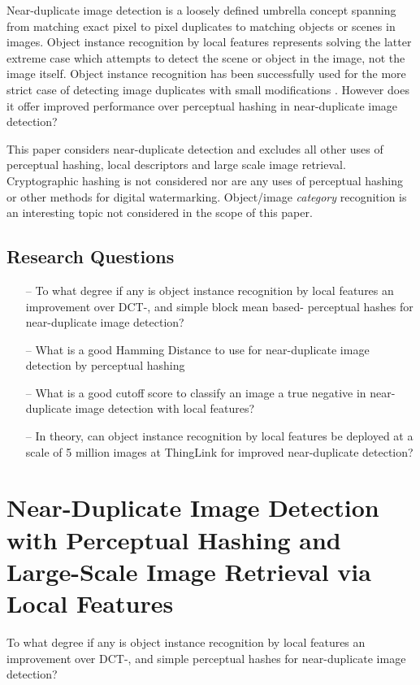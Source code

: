 \documentclass[english,12pt,a4paper,pdftex,elec,utf8, table]{aaltothesis}
\begin{document}
Near-duplicate image detection is a loosely defined umbrella concept spanning from matching exact pixel to pixel duplicates to matching objects or scenes in images. Object instance recognition by local features represents solving the latter extreme case which attempts to detect the scene or object in the image, not the image itself. Object instance recognition has been successfully used for the more strict case of detecting image duplicates with small modifications \cite{dong2012high}. However does it offer improved performance over perceptual hashing in near-duplicate image detection?

This paper considers near-duplicate detection and excludes all other uses of perceptual hashing, local descriptors and large scale image retrieval. Cryptographic hashing is not considered nor are any uses of perceptual hashing or other methods for digital watermarking. Object/image \emph{category} recognition is an interesting topic not considered in the scope of this paper.

\subsection{Research Questions}
\begin{itemize}
\item[--] To what degree if any is object instance recognition by local features an improvement over DCT-, and simple block mean based- perceptual hashes for near-duplicate image detection?
\item[--] What is a good Hamming Distance to use for near-duplicate image detection by perceptual hashing
\item[--] What is a good cutoff score to classify an image a true negative in near-duplicate image detection with local features?
\item[--] In theory, can object instance recognition by local features be deployed at a scale of 5 million images at ThingLink for improved near-duplicate detection?
\end{itemize}

\clearpage

\section{Near-Duplicate Image Detection with Perceptual Hashing and \\Large-Scale Image Retrieval via Local Features}
To what degree if any is object instance recognition by local features an improvement over DCT-, and simple perceptual hashes for near-duplicate image detection?
\end{document}
